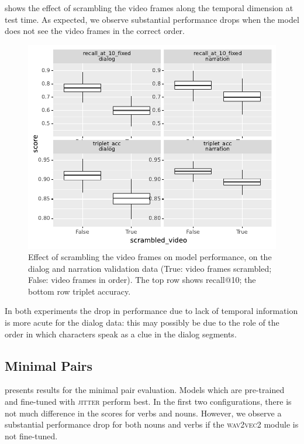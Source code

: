  shows the effect of scrambling the video frames 
along the temporal dimension at test time. As expected, we observe substantial 
performance drops when the model does not see the video frames in 
the correct order. 
\begin{figure}[htb]
	\centering
	\includegraphics[width=\columnwidth]{results/ablations/scrambled_video.pdf}
	\caption{Effect of scrambling the video frames on model performance, on the 
	dialog and narration validation data (True: video frames scrambled;
        False: video frames in order). The top row shows recall@10;
		the bottom row triplet accuracy.}
	\label{fig:scrambled_video}
\end{figure}
In both experiments the drop in performance due to lack of temporal
information is more acute for the dialog data: this may possibly be due to the
role of the order in which characters speak as a clue in the
dialog segments.

\subsection{Minimal Pairs}
\label{sec:minimal-pairs}


 presents results for the minimal pair 
evaluation. Models which are 
pre-trained and fine-tuned with \textsc{jitter} perform best. In the first two 
configurations, there is not much difference in the scores for verbs and nouns. 
However, we observe a substantial performance drop for both nouns and verbs if 
the \textsc{wav2vec2} module is not fine-tuned.

